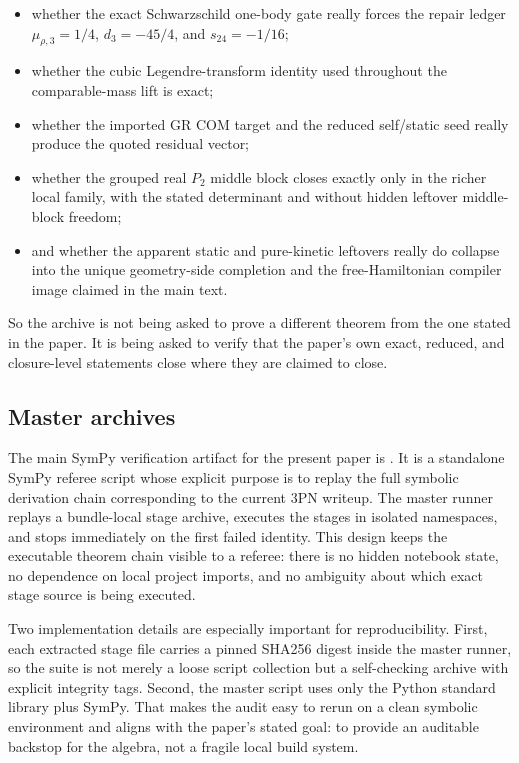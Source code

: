 \documentclass[11pt]{article}
\begin{document}
\begin{itemize}
  \item whether the exact Schwarzschild one-body gate really forces the repair
  ledger \(\mu_{\rho,3}=1/4\), \(d_3=-45/4\), and \(s_{24}=-1/16\);
  \item whether the cubic Legendre-transform identity used throughout the
  comparable-mass lift is exact;
  \item whether the imported GR COM target and the reduced self/static seed
  really produce the quoted residual vector;
  \item whether the grouped real $P_2$ middle block closes exactly only in the
  richer local family, with the stated determinant and without hidden leftover
  middle-block freedom;
  \item and whether the apparent static and pure-kinetic leftovers really do
  collapse into the unique geometry-side completion and the free-Hamiltonian
  compiler image claimed in the main text.
\end{itemize}

So the archive is not being asked to prove a different theorem from the one
stated in the paper.  It is being asked to verify that the paper's own exact,
reduced, and closure-level statements close where they are claimed to close.

\subsection{Master archives}
\label{sec:verification-master}

The main SymPy verification artifact for the present paper is
.  It is a standalone SymPy
referee script whose explicit purpose is to replay the full symbolic derivation
chain corresponding to the current $3$PN writeup.  The master runner replays a
bundle-local stage archive, executes the stages in isolated namespaces, and
stops immediately on the first failed identity.  This design keeps the
executable theorem chain visible to a referee: there is no hidden notebook
state, no dependence on local project imports, and no ambiguity about which
exact stage source is being executed.

Two implementation details are especially important for reproducibility.  First,
each extracted stage file carries a pinned SHA256 digest inside the master
runner, so the suite is not merely a loose script collection but a self-checking
archive with explicit integrity tags.  Second, the master script uses only the
Python standard library plus SymPy.  That makes the audit easy to rerun on a
clean symbolic environment and aligns with the paper's stated goal: to provide
an auditable backstop for the algebra, not a fragile local build system.
\end{document}
